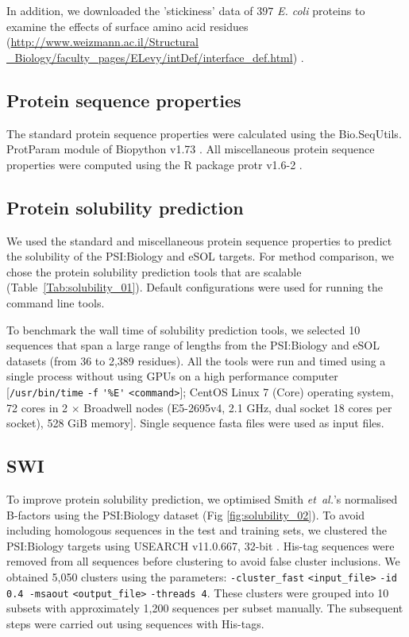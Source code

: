 In addition, we downloaded the 'stickiness’ data of $397$ \textit{E. coli} proteins to examine the effects of surface amino acid residues (\href{http://www.weizmann.ac.il/Structural\_Biology/faculty\_pages/ELevy/intDef/interface\_def.html}{http://www.weizmann.ac.il/Structural\\\_Biology/faculty\_pages/ELevy/intDef/interface\_def.html}) \citep{Levy2012-ct}.

\subsection{Protein sequence properties}
The standard protein sequence properties were calculated using the Bio.SeqUtils. ProtParam module of Biopython v1.73 \citep{Cock2009-jl}. All miscellaneous protein sequence properties were computed using the R package protr v1.6-2 \citep{Xiao2015-uw}. 

\subsection{Protein solubility prediction}
We used the standard and miscellaneous protein sequence properties to predict the solubility of the PSI:Biology and eSOL targets. For method comparison, we chose the protein solubility prediction tools that are scalable (Table~\ref{Tab:solubility_01}). Default configurations were used for running the command line tools.

To benchmark the wall time of solubility prediction tools, we selected 10 sequences that span a large range of lengths from the PSI:Biology and eSOL datasets (from 36 to 2,389 residues). All the tools were run and timed using a single process without using GPUs on a high performance computer [\verb|/usr/bin/time| \verb|-f| \verb|'%E'| \verb|<command>|]; CentOS Linux 7 (Core) operating system, 72 cores in 2 $\times$ Broadwell nodes (E5-2695v4, 2.1 GHz, dual socket 18 cores per socket), 528 GiB memory]. Single sequence fasta files were used as input files.


\subsection{SWI}
To improve protein solubility prediction, we optimised Smith {\it et~al.}’s normalised B-factors using the PSI:Biology dataset (Fig \ref{fig:solubility_02}). To avoid including homologous sequences in the test and training sets, we clustered the PSI:Biology targets using USEARCH v11.0.667, 32-bit \citep{Edgar2010-fc}. His-tag sequences were removed from all sequences before clustering to avoid false cluster inclusions. We obtained 5,050 clusters using the parameters: \verb|-cluster_fast| \verb|<input_file>| \verb|-id 0.4 -msaout| \verb|<output_file>| \verb|-threads 4|. These clusters were grouped into 10 subsets with approximately 1,200 sequences per subset manually. The subsequent steps were carried out using sequences with His-tags. 

